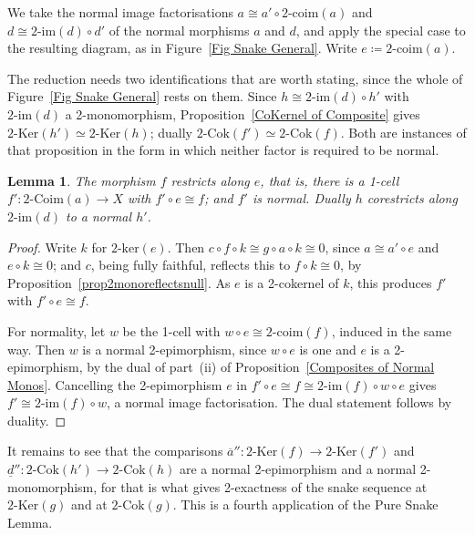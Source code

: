\documentclass[reqno,a4paper]{amsart}
\numberwithin{equation}{section}
\theoremstyle{plain}
\newtheorem{lemma}[subsection]{Lemma}
\theoremstyle{definition}
\def\nameit#1{\textrm{#1}~}
\def\prox{\nameit{Proposition}}
\newcommand{\comp}{\circ}
\newcommand{\iso}{\cong}
\newcommand{\ov}[1]{\overline{#1}}
\renewcommand{\1}{\onecat{1}}
\newcommand{\TwoKer}{\ensuremath{2\text{-}\mathrm{Ker}}}
\newcommand{\TwoCoker}{\ensuremath{2\text{-}\mathrm{Cok}}}
\newcommand{\twoker}{\ensuremath{2\text{-}\mathrm{ker}}}
\newcommand{\twoimg}{\ensuremath{2\text{-}\mathrm{im}}}
\newcommand{\TwoCoim}{\ensuremath{2\text{-}\mathrm{Coim}}}
\newcommand{\twocoim}{\ensuremath{2\text{-}\mathrm{coim}}}
\begin{document}
We take the normal image factorisations \(a\iso a'\comp\twocoim(a)\) and \(d\iso\twoimg(d)\comp d'\) of the normal morphisms \(a\) and \(d\), and apply the special case to the resulting diagram, as in Figure~\ref{Fig Snake General}. Write \(e\coloneq\twocoim(a)\).

The reduction needs two identifications that are worth stating, since the whole of Figure~\ref{Fig Snake General} rests on them. Since \(h\iso\twoimg(d)\comp h'\) with \(\twoimg(d)\) a 2-monomorphism, \prox\ref{CoKernel of Composite} gives \(\TwoKer(h')\simeq\TwoKer(h)\); dually \(\TwoCoker(f')\simeq\TwoCoker(f)\). Both are instances of that proposition in the form in which neither factor is required to be normal.

\begin{lemma}\label{L:Restriction}
	The morphism \(f\) restricts along \(e\), that is, there is a 1-cell \(f'\colon\TwoCoim(a)\to X\) with \(f'\comp e\iso f\); and \(f'\) is normal. Dually \(h\) corestricts along \(\twoimg(d)\) to a normal \(h'\).
\end{lemma}
\begin{proof}
	Write \(k\) for \(\twoker(e)\). Then \(c\comp f\comp k\iso g\comp a\comp k\iso 0\), since \(a\iso a'\comp e\) and \(e\comp k\iso 0\); and \(c\), being fully faithful, reflects this to \(f\comp k\iso 0\), by \prox\ref{prop2monoreflectsnull}. As \(e\) is a 2-cokernel of \(k\), this produces \(f'\) with \(f'\comp e\iso f\).

	For normality, let \(w\) be the 1-cell with \(w\comp e\iso\twocoim(f)\), induced in the same way. Then \(w\) is a normal 2-epimorphism, since \(w\comp e\) is one and \(e\) is a 2-epimorphism, by the dual of part~\textup{(ii)} of \prox\ref{Composites of Normal Monos}. Cancelling the 2-epimorphism \(e\) in \(f'\comp e\iso f\iso\twoimg(f)\comp w\comp e\) gives \(f'\iso\twoimg(f)\comp w\), a normal image factorisation. The dual statement follows by duality.
\end{proof}

It remains to see that the comparisons \(\ov{a}''\colon\TwoKer(f)\to\TwoKer(f')\) and \(\underline{d}''\colon\TwoCoker(h')\to\TwoCoker(h)\) are a normal 2-epimorphism and a normal 2-monomorphism, for that is what gives 2-exactness of the snake sequence at \(\TwoKer(g)\) and at \(\TwoCoker(g)\). This is a fourth application of the Pure Snake Lemma.
\end{document}

